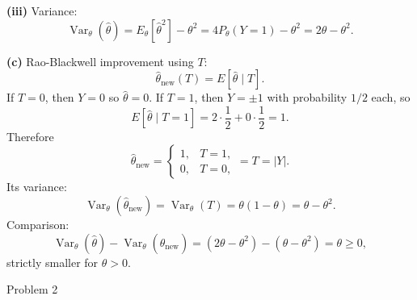 \documentclass[12pt,a4paper,onecolumn]{exam}
\newcommand{\questionheader}[1]{%
  \begin{tcolorbox}[
    enhanced,
    colback=black,
    coltext=white,
    boxrule=0pt,
    fontupper=\Large\bfseries,
    arc=4mm
  ]
  #1
  \end{tcolorbox}%
}
\begin{document}
\begin{solution}
\textbf{(iii)} Variance:
\[
\operatorname{Var}_\theta(\hat\theta)=E_\theta[\hat\theta^2]-\theta^2
=4P_\theta(Y=1)-\theta^2
=2\theta-\theta^2.
\]

\vspace{0.5em}
\textbf{(c)} Rao-Blackwell improvement using $T$:
\[
\hat\theta_{\text{new}}(T)=E[\hat\theta\mid T].
\]
If $T=0$, then $Y=0$ so $\hat\theta=0$.
If $T=1$, then $Y=\pm1$ with probability $1/2$ each, so
\[
E[\hat\theta\mid T=1]=2\cdot\frac12+0\cdot\frac12=1.
\]
Therefore
\[
\hat\theta_{\text{new}}=
\begin{cases}
1,&T=1,\\
0,&T=0,
\end{cases}
=T=|Y|.
\]
Its variance:
\[
\operatorname{Var}_\theta(\hat\theta_{\text{new}})
=\operatorname{Var}_\theta(T)=\theta(1-\theta)=\theta-\theta^2.
\]
Comparison:
\[
\operatorname{Var}_\theta(\hat\theta)-\operatorname{Var}_\theta(\hat\theta_{\text{new}})
=(2\theta-\theta^2)-(\theta-\theta^2)=\theta\ge0,
\]
strictly smaller for $\theta>0$.
\end{solution}
\questionheader{Problem 2}
\end{document}
